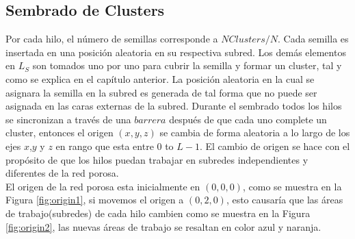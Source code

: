 \subsection{Sembrado de Clusters}
\label{subsec:pseeding}
Por cada hilo, el número de semillas corresponde a $NClusters/N$. Cada semilla es insertada en una posición aleatoria en su respectiva subred. Los demás elementos en $L_S$ son tomados uno por uno para cubrir la semilla y formar un cluster, tal y como se explica en el capítulo anterior. La posición aleatoria en la cual se asignara la semilla en la subred es generada de tal forma que no puede ser asignada en las caras externas de la subred. Durante el sembrado todos los hilos se sincronizan a través de una $barrera$ después de que cada uno complete un cluster, entonces el origen $(x, y, z)$ se cambia  de forma aleatoria a lo largo de los ejes $x$,$y$ y $z$ en rango que esta entre $0$ to $L-1$. El cambio de origen se hace con el propósito de que los hilos puedan trabajar en subredes independientes y diferentes de la red porosa.\\

El origen de la red porosa esta inicialmente en $(0,0,0)$, como se muestra en la Figura \ref{fig:origin1}, si movemos el origen a $(0,2,0)$, esto causaría que las áreas de trabajo(subredes) de cada hilo cambien como se muestra en la Figura \ref{fig:origin2}, las nuevas áreas de trabajo se resaltan en color azul y naranja.\\

